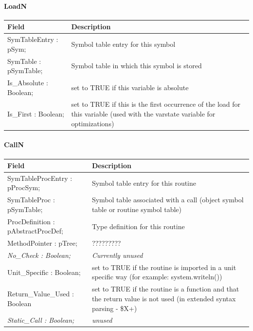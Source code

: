 \documentclass [a4paper,12pt]{article}
\begin{document}
\paragraph{LoadN}\mbox{}

\begin{longtable}{|l|p{10cm}|}
\hline
Field   & Description \\
\hline
\endhead
\hline
\endfoot
\textsf{SymTableEntry : pSym;}&
    Symbol table entry for this symbol \\
\textsf{SymTable : pSymTable;}&
    Symbol table in which this symbol is stored \\
\textsf{Is{\_}Absolute : Boolean;}&
    set to TRUE if this variable is absolute \\
\textsf{Is{\_}First : Boolean;}&
    set to TRUE if this is the first occurrence of the load for this
    variable (used with the varstate variable for optimizations) \\
\hline
\end{longtable}

\paragraph{CallN}\mbox{}

\begin{longtable}{|l|p{10cm}|}
\hline
Field   & Description \\
\hline
\endhead
\hline
\endfoot
\textsf{SymTableProcEntry : pProcSym;}&
    Symbol table entry for this routine \\
\textsf{SymTableProc : pSymTable;}&
    Symbol table associated with a call (object symbol table or routine
    symbol table) \\
\textsf{ProcDefinition : pAbstractProcDef;}&
    Type definition for this routine \\
\textsf{MethodPointer : pTree;}&
    ????????? \\
\textsf{\textit{No{\_}Check : Boolean;}}&
    \textit{Currently unused} \\
\textsf{Unit{\_}Specific : Boolean;}&
    set to TRUE if the routine is imported in a unit specific way (for
    example: system.writeln()) \\
\textsf{Return{\_}Value{\_}Used : Boolean}&
    set to TRUE if the routine is a function and that the return value
    is not used (in extended syntax parsing - {\$}X+) \\
\textsf{\textit{Static{\_}Call : Boolean;}}&
    \textit{unused} \\
\hline
\end{longtable}
\end{document}

